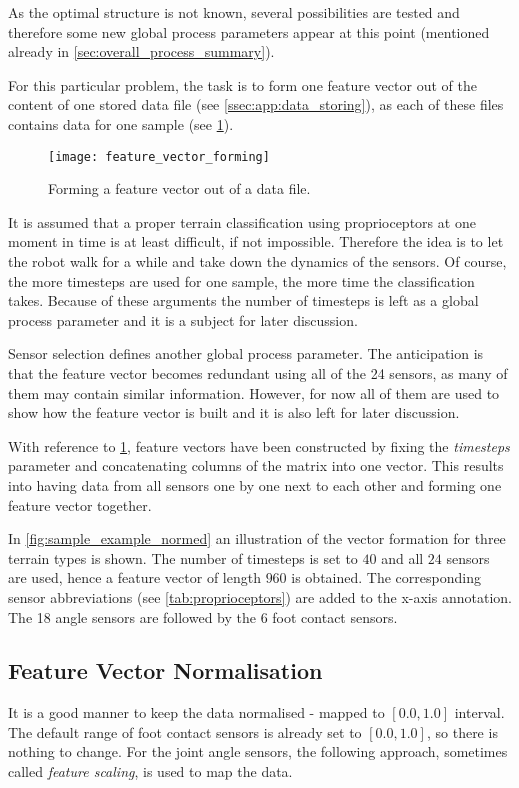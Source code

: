 As the optimal structure is not known, several possibilities are tested and therefore some new global process parameters appear at this point (mentioned already in \cref{sec:overall_process_summary}).

For this particular problem, the task is to form one feature vector out of the content of one stored data file (see \cref{ssec:app:data_storing}), as each of these files contains data for one sample (see \cref{img:feature_vector_forming}).

\begin{figure}[H]
  \centering
  \texttt{[image: feature\_vector\_forming]}
  \caption{Forming a feature vector out of a data file.}
  \label{img:feature_vector_forming}
\end{figure}

It is assumed that a proper terrain classification using proprioceptors at one moment in time is at least difficult, if not impossible. Therefore the idea is to let the robot walk for a while and take down the dynamics of the sensors. Of course, the more timesteps are used for one sample, the more time the classification takes. Because of these arguments the number of timesteps is left as a global process parameter and it is a subject for later discussion.

Sensor selection defines another global process parameter. The anticipation is that the feature vector becomes redundant using all of the 24 sensors, as many of them may contain similar information. However, for now all of them are used to show how the feature vector is built and it is also left for later discussion.

With reference to \cref{img:feature_vector_forming}, feature vectors have been constructed by fixing the \textit{timesteps} parameter and concatenating columns of the matrix into one vector. This results into having data from all sensors one by one next to each other and forming one feature vector together. 

In \cref{fig:sample_example_normed} an illustration of the vector formation for three terrain types is shown. The number of timesteps is set to $ 40 $ and all $ 24 $ sensors are used, hence a feature vector of length $ 960 $ is obtained. The corresponding sensor abbreviations (see \cref{tab:proprioceptors}) are added to the x-axis annotation. The 18 angle sensors are followed by the 6 foot contact sensors.

\subsection{Feature Vector Normalisation} \label{ssec:normalisation}
It is a good manner to keep the data normalised - mapped to $ [0.0, 1.0] $ interval. The default range of foot contact sensors is already set to $ [0.0, 1.0] $, so there is nothing to change. For the joint angle sensors, the following approach, sometimes called \textit{feature scaling}, is used to map the data.


